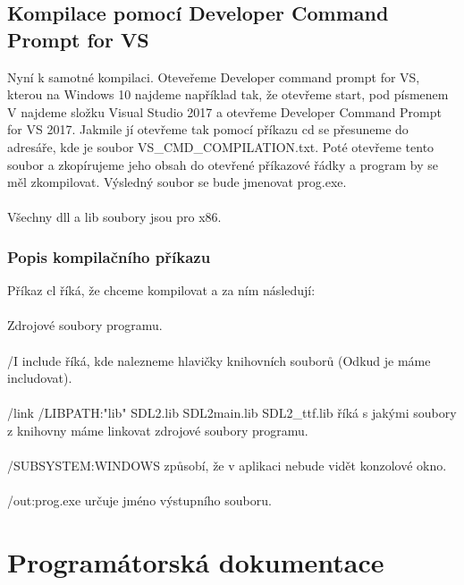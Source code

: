 \documentclass[12pt]{article}
\begin{document}
	\newpage
	\subsection{Kompilace pomocí Developer Command Prompt for VS}
	Nyní k samotné kompilaci. Oteveřeme Developer command prompt for VS, kterou na Windows 10 najdeme například tak, že otevřeme start, pod písmenem V najdeme složku Visual Studio 2017 a otevřeme Developer Command Prompt for VS 2017. Jakmile jí otevřeme tak pomocí příkazu cd se přesuneme do adresáře, kde je soubor VS\_CMD\_COMPILATION.txt. Poté otevřeme tento soubor a zkopírujeme jeho obsah do otevřené příkazové řádky a program by se měl zkompilovat. Výsledný soubor se bude jmenovat prog.exe. 
	\\
	\\
	Všechny dll a lib soubory jsou pro x86.
	
	\subsubsection{Popis kompilačního příkazu}
	Příkaz cl říká, že chceme kompilovat a za ním následují:
	\\
	\\
	Zdrojové soubory programu.
	\\
	\\
	/I include říká, kde nalezneme hlavičky knihovních souborů (Odkud je máme includovat).
	\\
	\\
	/link /LIBPATH:"lib" SDL2.lib SDL2main.lib SDL2\_ttf.lib říká s jakými soubory z knihovny máme linkovat zdrojové soubory programu.
	\\
	\\
	/SUBSYSTEM:WINDOWS způsobí, že v aplikaci nebude vidět konzolové okno.
	\\
	\\
	/out:prog.exe určuje jméno výstupního souboru.

	\newpage  
	\maketitle\section{Programátorská dokumentace}
\end{document}
